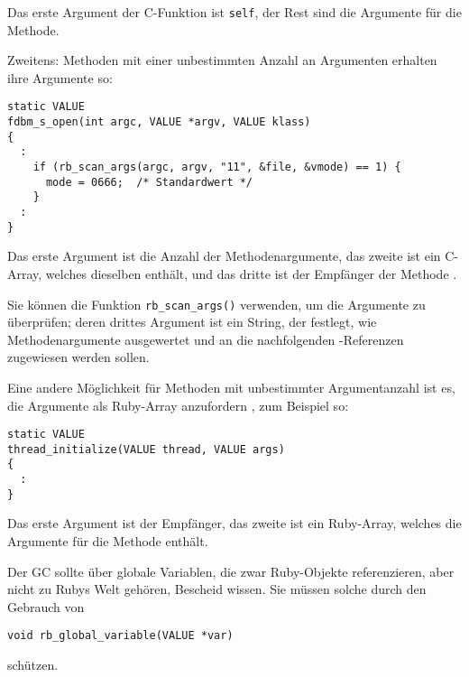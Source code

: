 Das erste Argument der C-Funktion ist \verb+self+, der Rest sind die
Argumente für die Methode.

Zweitens: Methoden mit einer unbestimmten Anzahl an Argumenten
 erhalten
ihre Argumente so:

\begin{lstlisting}
static VALUE
fdbm_s_open(int argc, VALUE *argv, VALUE klass)
{
  :
    if (rb_scan_args(argc, argv, "11", &file, &vmode) == 1) {
      mode = 0666;  /* Standardwert */
    }
  :
}
\end{lstlisting}

Das erste Argument ist die Anzahl der Methodenargumente, das zweite
ist ein C-Array, welches dieselben enthält, und das dritte ist der
Empfänger der Methode .

Sie können die Funktion \verb+rb_scan_args()+ verwenden, um die
Argumente zu überprüfen; deren drittes Argument ist ein String, der
festlegt, wie Methodenargumente ausgewertet und an die nachfolgenden
\VALUE-Referenzen zugewiesen werden sollen. 

Eine andere Möglichkeit für Methoden mit unbestimmter Argumentanzahl
ist es, die Argumente als Ruby-Array anzufordern , zum Beispiel so:

\begin{lstlisting}
static VALUE
thread_initialize(VALUE thread, VALUE args)
{
  :
}
\end{lstlisting}

Das erste Argument ist der Empfänger, das zweite ist ein Ruby-Array,
welches die Argumente für die Methode enthält.

\begin{notice}
  Der GC sollte über globale Variablen, die zwar Ruby-Objekte
  referenzieren, aber nicht zu Rubys Welt gehören, Bescheid wissen. Sie
  müssen solche durch den Gebrauch von

  \begin{lstlisting}
void rb_global_variable(VALUE *var)
  \end{lstlisting}

  \noindent schützen.
\end{notice}

